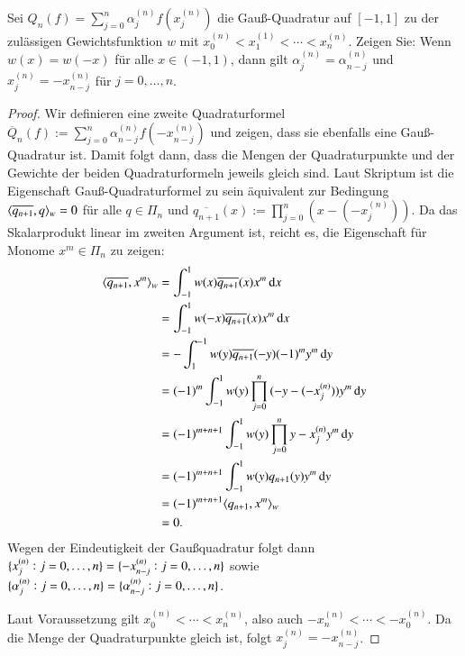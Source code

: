 
\begin{exercise}
  Sei $Q_n(f) = \sum_{j=0}^n{\alpha_j^{(n)}f(x_j^{(n)})}$ die Gauß-Quadratur auf $[-1,1]$ zu der zulässigen Gewichtsfunktion $w$ mit $x_0^{(n)}<x_1^{(1)}< \cdots <x_n^{(n)}$. Zeigen Sie: Wenn $w(x)=w(-x)$ für alle $x \in (-1,1)$, dann gilt $\alpha_j^{(n)}=\alpha_{n-j}^{(n)}$ und $x_j^{(n)}=-x_{n-j}^{(n)}$ für $j=0, \dots, n$.
\end{exercise}

\begin{proof}
  Wir definieren eine zweite Quadraturformel $\overline{Q}_n(f):=\sum_{j=0}^n{\alpha_{n-j}^{(n)} f(-x_{n-j}^{(n)})}$ und zeigen, dass sie ebenfalls eine Gauß-Quadratur ist.
  Damit folgt dann, dass die Mengen der Quadraturpunkte und der Gewichte der beiden Quadraturformeln jeweils gleich sind.
  Laut Skriptum ist die Eigenschaft Gauß-Quadraturformel zu sein äquivalent zur Bedingung $\langle {\overline{q_{n+1}}},{q} \rangle_w=0$ für alle $q \in \Pi_n$ und $\overline{q_{n+1}}(x):=\prod_{j=0}^n{(x-(-x_j^{(n)}))}$.
  Da das Skalarprodukt linear im zweiten Argument ist, reicht es, die Eigenschaft für Monome $x^m \in \Pi_n$ zu zeigen:
  \begin{equation*}
    \begin{split}
      \dotproduct{\overline{q_{n+1}}}{x^m}_w
      &= \int_{-1}^1{w(x)\overline{q_{n+1}}(x)x^m \dif x} \\
      &= \int_{-1}^1{w(-x)\overline{q_{n+1}}(x)x^m \dif x} \\
      &= -\int_1^{-1}{w(y)\overline{q_{n+1}}(-y){(-1)}^m y^m \dif y} \\
      &= {(-1)}^m \int_{-1}^1{w(y)\prod_{j=0}^n{(-y-(-x_j^{(n)}))}y^m \dif y} \\
      &= {(-1)}^{m+n+1} \int_{-1}^1{w(y)\prod_{j=0}^n{y-x_j^{(n)}} y^m \dif y} \\
      &= {(-1)}^{m+n+1} \int_{-1}^1{w(y)q_{n+1}(y) y^m\dif y} \\
      &= {(-1)}^{m+n+1} \dotproduct{q_{n+1}}{x^m}_w \\
      &= 0.
    \end{split}
  \end{equation*}
  Wegen der Eindeutigkeit der Gaußquadratur folgt dann
  $\{x_j^{(n)}:j=0,\dots,n\}=\{-x_{n-j}^{(n)}:j=0,\dots,n\}$
  sowie
  $\{\alpha_j^{(n)}:j=0,\dots,n\}=\{\alpha_{n-j}^{(n)}:j=0,\dots,n\}$.

  Laut Voraussetzung gilt $x_0^{(n)}< \cdots <x_n^{(n)}$, also auch $-x_n^{(n)}< \cdots < -x_0^{(n)}$.
  Da die Menge der Quadraturpunkte gleich ist, folgt $x_j^{(n)}=-x_{n-j}^{(n)}$.


\end{proof}
